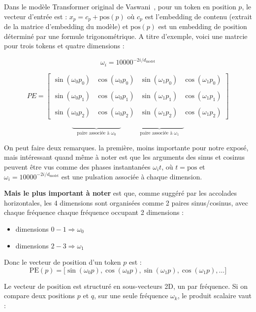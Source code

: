 \documentclass{article}
\begin{document}
Dans le modèle Transformer original de Vaswani~\cite{vaswani}, pour un token en position $p$, le vecteur d'entrée est : $x_p = c_p + \mathrm{pos}(p)$ où $c_p$ est l'embedding de contenu (extrait de la matrice d'embedding du modèle) et $\mathrm{pos}(p)$ est un embedding de position déterminé par une formule trigonométrique. A titre d'exemple, voici une matrcie pour trois tokens et quatre dimensions : 


\[
\omega_i = 10000^{-2i/d_{\mathrm{model}}}
\]

\[
PE=
\begin{bmatrix}
\sin(\omega_0 p_0) & \cos(\omega_0 p_0) &
\sin(\omega_1 p_0) & \cos(\omega_1 p_0) \\
\\
\sin(\omega_0 p_1) & \cos(\omega_0 p_1) &
\sin(\omega_1 p_1) & \cos(\omega_1 p_1) \\
\\
\sin(\omega_0 p_2) & \cos(\omega_0 p_2) &
\sin(\omega_1 p_2) & \cos(\omega_1 p_2)
\end{bmatrix}
\]

\[
\underbrace{\hspace{3cm}}_{\text{paire associée à }\omega_0}
\qquad
\underbrace{\hspace{3cm}}_{\text{paire associée à }\omega_1}
\]

On peut faire deux remarques. la première, moins importante pour notre exposé, mais intéressant quand même à noter est que les arguments des sinus et cosinus peuvent être vus comme des phases instantanées
$\omega_i t$, où $t = \mathrm{pos}$ et
$\omega_i = 10000^{-2i/d_{\mathrm{model}}}$
est une pulsation associée à chaque dimension.

\vspace{0.3pt}
\textbf{Mais le plus important à noter} est que, comme suggéré par les accolades horizontales, les 4 dimensions sont organisées comme 2 paires sinus/cosinus, avec chaque fréquence chaque fréquence occupant 2 dimensions : 

\begin{itemize}
    \item dimensions $0-1 \Rightarrow \omega_0$
    \item dimensions $2-3 \Rightarrow \omega_1$
\end{itemize} 

	
Donc le vecteur de position d'un token $p$ est :
\[
\mathrm{PE}(p) =
\big[
\sin(\omega_0 p), \cos(\omega_0 p),
\sin(\omega_1 p), \cos(\omega_1 p),
\ldots
\big]
\]

Le vecteur de position est structuré en sous-vecteurs 2D, un par fréquence. 
Si on compare deux positions $p$ et $q$, sur une seule fréquence $\omega_k$, le produit scalaire vaut :
\end{document}
